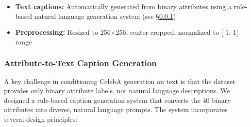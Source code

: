 \begin{itemize}
\begin{multicols}{3}
\begin{enumerate}
        \item Pointy Nose
        \item Receding Hairline
        \item Rosy Cheeks
        \item Sideburns
        \item Smiling
        \item Straight Hair
        \item Wavy Hair
        \item Wearing Earrings
        \item Wearing Hat
        \item Wearing Lipstick
        \item Wearing Necklace
        \item Wearing Necktie
        \item Young
    \end{enumerate}
    \end{multicols}
    \item \textbf{Text captions:} Automatically generated from binary attributes using a rule-based natural language generation system (see \S\ref{sec:celeba-caption-generation})
    \item \textbf{Preprocessing:} Resized to 256$\times$256, center-cropped, normalized to [-1, 1] range
\end{itemize}

\subsubsection{Attribute-to-Text Caption Generation}
\label{sec:celeba-caption-generation}

A key challenge in conditioning CelebA generation on text is that the dataset provides only binary attribute labels, not natural language descriptions. We designed a rule-based caption generation system that converts the 40 binary attributes into diverse, natural language prompts. The system incorporates several design principles:

